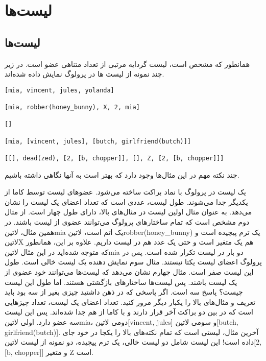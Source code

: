 \chapter{لیست‌ها}

\section{لیست‌ها}

همانطور که مشخص است، لیست گردایه‌ مرتبی از تعداد متناهی عضو است. در زیر چند نمونه از لیست ها در پرولوگ نمایش داده شده‌اند.

\begin{latin}
\begin{lstlisting}
[mia, vincent, jules, yolanda]

[mia, robber(honey_bunny), X, 2, mia]

[]

[mia, [vincent, jules], [butch, girlfriend(butch)]]

[[], dead(zed), [2, [b, chopper]], [], Z, [2, [b, chopper]]]
\end{lstlisting}
\end{latin}

چند نکته مهم در این مثال‌ها وجود دارد که بهتر است به آنها نگاهی داشته باشیم.

\begin{enumerate}
 یک لیست در پرولوگ با نماد براکت ساخته می‌شود. عضوهای لیست توسط کاما از یکدیگر جدا می‌شوند. طول لیست، عددی است که تعداد اعضای یک لیست را نشان می‌دهد. به عنوان مثال اولین لیست در مثال‌های بالا، دارای طول چهار است.
 از مثال دوم مشخص است که تمام ساختارهای پرولوگ می‌توانند عضوی از لیست باشند. در همین مثال، ‌لاتین{mia} یک اتم است، ‌لاتین{robber(honey\_bunny)} یک ترم پیچیده است و ‌لاتین{X} هم یک متغیر است و حتی یک عدد هم در لیست داریم. علاوه بر این، همانطور که متوجه شده‌اید در این مثال ‌لاتین{mia} دو بار در لیست تکرار شده است. پس در پرولوگ اعضای لیست یکتا نیستند.
 مثال سوم نمایش دهنده یک لیست خالی است. طول این لیست صفر است.
 مثال چهارم نشان می‌دهد که لیست‌ها می‌توانند خود عضوی از یک لیست باشند. پس لیست‌ها ساختارهای بازگشتی هستند. اما طول این لیست چیست؟ پاسخ سه است. اگر پاسخی که در ذهن داشتید چیزی بغیر از سه بود باید تعریف و مثال‌های بالا را یکبار دیگر مرور کنید. تعداد اعضای یک لیست، تعداد چیزهایی است که در بین دو براکت آخر قرار دارند و با کاما از هم جدا شده‌اند. پس این لیست سه عضو دارد. اولی ‌لاتین{mia}، دومی ‌لاتین{[vincent, jules]} و سومی ‌لاتین{[butch, girlfriend(butch)]}.
 آخرین مثال، لیستی است که تمام نکته‌های بالا را یکجا در خود جای داده است! این لیست شامل دو لیست خالی، یک ترم پیچیده، دو نمونه از لیست ‌لاتین{[2, [b, chopper]]} و متغیر Z است.
\end{enumerate}

